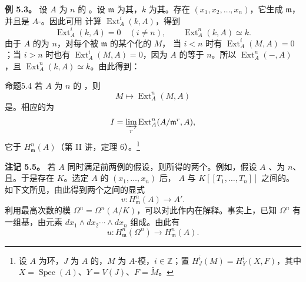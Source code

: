 \textbf{例 5.3。} 设 $A$ 为 $n$ 的 。设 $\mathfrak m$ 为其，$k$ 为其。存在 $(x_1,x_2,\ldots,x_n)$，它生成 $\mathfrak m$，并且是 $A$-。因此可用 计算 $\operatorname{Ext}^i_A(k,A)$，得到
\[\operatorname{Ext}^i_A(k,A)=0\quad(i\ne n),\qquad\operatorname{Ext}^n_A(k,A)\simeq k.\]
由于 $A$ 的为 $n$，对每个被 $\mathfrak m$ 的某个化的 $M$，
当 $i<n$ 时有 $\operatorname{Ext}^i_A(M,A)=0$；当 $i>n$ 时也有 $\operatorname{Ext}^i_A(M,A)=0$，因为 $A$ 的等于 $n$。所以 $\operatorname{Ext}^n_A(-,A)$ ，且 $\operatorname{Ext}^n_A(k,A)\simeq k$。由此得到：
\begin{SGAresult}{命题}{5.4}
若 $A$ 为 $n$ 的 ，则
\[M\longmapsto\operatorname{Ext}^n_A(M,A)\]
是。相应的为
\[I=\varinjlim_r\operatorname{Ext}^n_A(A/\mathfrak m^r,A),\]
它于 $H^n_{\mathfrak m}(A)$（第 II 讲，定理 6）。\begingroup\renewcommand{\thefootnote}{*}\footnote[1]{设 $A$ 为环，$J$ 为 $A$ 的，$M$ 为 $A$-模，$i\in\mathbb Z$；置 $H^i_J(M)=H^i_Y(X,F)$，其中 $X=\operatorname{Spec}(A)$、$Y=V(J)$、$F=\widetilde M$。}\endgroup{}
\end{SGAresult}
\textbf{注记 5.5。} 若 $A$ 同时满足前两例的假设，则所得的两个。例如，假设 $A$ 、为 $n$、且。于是存在 $K$。选定 $A$ 的 $(x_1,\ldots,x_n)$ 后， $A$ 与 $K[[T_1,\ldots,T_n]]$ 之间的。如下文所见，由此得到两个之间的显式
\[v:H^n_{\mathfrak m}(A)\longrightarrow A'.\]
利用最高次数的模 $\Omega^n=\Omega^n(A/K)$，可以对此作内在解释。事实上，已知 $\Omega^n$ 有一组基，由元素 $dx_1\wedge dx_2\cdots\wedge dx_n$ 组成。由此有
\[u:H^n_{\mathfrak m}(\Omega^n)\longrightarrow H^n_{\mathfrak m}(A).\]
